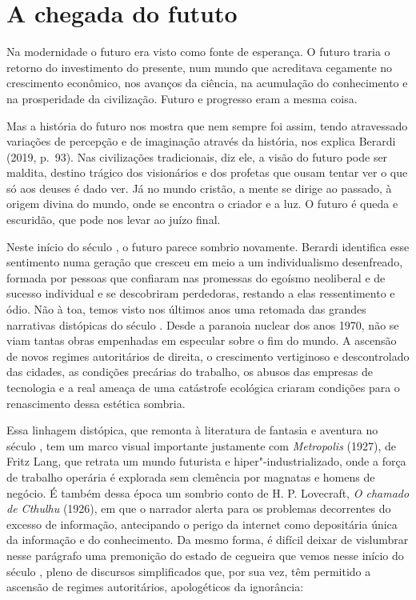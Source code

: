 \chapter{A chegada do fututo}

Na modernidade o futuro era visto como fonte de esperança. O futuro
traria o retorno do investimento do presente, num mundo que acreditava
cegamente no crescimento econômico, nos avanços da ciência, na
acumulação do conhecimento e na prosperidade da civilização. Futuro e
progresso eram a mesma coisa.

Mas a história do futuro nos mostra que nem sempre foi assim, tendo
atravessado variações de percepção e de imaginação através da história,
nos explica Berardi (2019, p.~93). Nas civilizações tradicionais, diz
ele, a visão do futuro pode ser maldita, destino trágico dos visionários
e dos profetas que ousam tentar ver o que só aos deuses é dado ver. Já
no mundo cristão, a mente se dirige ao passado, à origem divina do
mundo, onde se encontra o criador e a luz. O futuro é queda e escuridão,
que pode nos levar ao juízo final.

Neste início do século , o futuro parece sombrio novamente. Berardi
identifica esse sentimento numa geração que cresceu em meio a um
individualismo desenfreado, formada por pessoas que confiaram nas
promessas do egoísmo neoliberal e de sucesso individual e se descobriram
perdedoras, restando a elas ressentimento e ódio. Não à toa, temos visto
nos últimos anos uma retomada das grandes narrativas distópicas do
século . Desde a paranoia nuclear dos anos 1970, não se viam tantas
obras empenhadas em especular sobre o fim do mundo. A ascensão de novos
regimes autoritários de direita, o crescimento vertiginoso e
descontrolado das cidades, as condições precárias do trabalho, os abusos
das empresas de tecnologia e a real ameaça de uma catástrofe ecológica
criaram condições para o renascimento dessa estética sombria.

Essa linhagem distópica, que remonta à literatura de fantasia e aventura
no século , tem um marco visual importante justamente com
\emph{Metropolis} (1927), de Fritz Lang, que retrata um mundo futurista
e hiper"-industrializado, onde a força de trabalho operária é explorada
sem clemência por magnatas e homens de negócio. É também dessa época um sombrio conto de H. P. Lovecraft, \emph{O chamado de Cthulhu} (1926), em que o narrador alerta para os problemas decorrentes do excesso de informação, antecipando o perigo da internet como depositária única da informação e do conhecimento. Da mesmo forma, é difícil deixar de vislumbrar nesse parágrafo uma premonição do estado de cegueira que vemos nesse início do século , pleno de discursos simplificados que, por sua vez, têm permitido a ascensão de regimes autoritários, apologéticos da ignorância:

